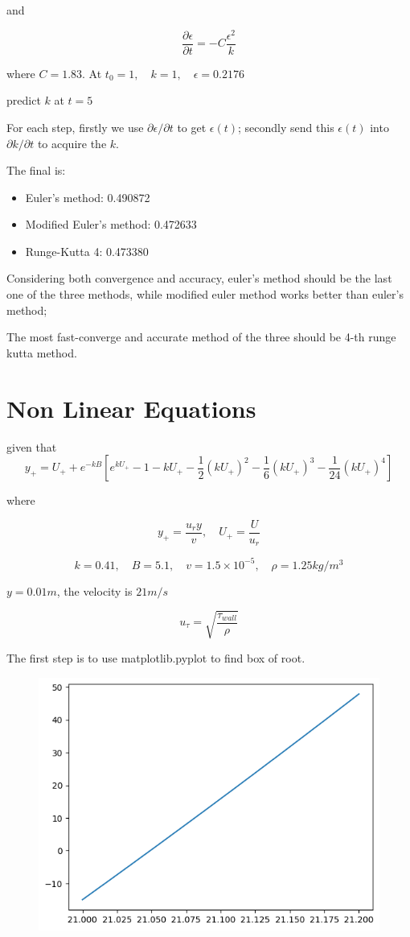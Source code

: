 \documentclass[conference]{IEEEtran}
\begin{document}
and

$$
\frac{\partial \epsilon}{\partial t} = -C \frac{\epsilon^2}{k}
$$

where $C=1.83$. At $t_0=1,\quad k=1,\quad \epsilon=0.2176$

predict $k$ at $t=5$

For each step, firstly we use ${\partial \epsilon}/{\partial t}$ to get $\epsilon(t)$;
secondly send this $\epsilon(t)$ into ${\partial k}/{\partial t}$ to acquire the $k$.

The final is:
\begin{itemize}
	\item Euler's method: 0.490872
	\item Modified Euler's method: 0.472633
	\item Runge-Kutta 4: 0.473380
\end{itemize}

Considering both convergence and accuracy, euler's method should be the last one of the three methods,
while modified euler method works better than euler's method;

The most fast-converge and accurate method of the three should be 4-th runge kutta method.

\section{Non Linear Equations}
given that
$$
y_+ = U_+ + e^{-kB} [e^{kU_+} - 1 - kU_+ - \frac12(kU_+)^2 - \frac16(kU_+)^3 - \frac{1}{24}(kU_+)^4]
$$

where

$$
y_+ = \frac{u_ry}{v}, \quad U_+=\frac{U}{u_r}
$$

$$
k=0.41, \quad B=5.1, \quad v=1.5\times 10^{-5}, \quad \rho=1.25 kg/m^3
$$

$y=0.01m$, the velocity is $21m/s$

$$
u_{\tau} = \sqrt{\frac{\tau_{wall}}{\rho}}
$$

The first step is to use matplotlib.pyplot to find box of root.

\begin{figure}[htbp]
	\centerline{\includegraphics[width=0.9\columnwidth]{3-1.png}}
\end{figure}
\end{document}
